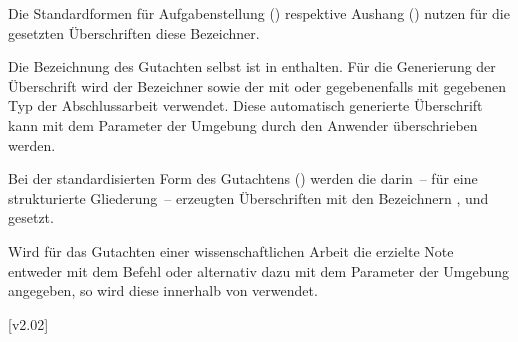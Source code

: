 \begin{DeclareEntity}{}
\begin{Declaration}
\begin{Declaration}
Die Standardformen für Aufgabenstellung () respektive Aushang 
() nutzen für die gesetzten Überschriften diese Bezeichner.
\end{Declaration}
\end{Declaration}

\begin{Declaration}
  {}
\begin{Declaration}
  {}
\printdeclarationlist

Die Bezeichnung des Gutachten selbst ist in  enthalten. 
Für die Generierung der Überschrift wird der Bezeichner  
sowie der mit  oder gegebenenfalls mit  gegebenen 
Typ der Abschlussarbeit verwendet. Diese automatisch generierte Überschrift 
kann mit dem Parameter  der Umgebung 
 durch den Anwender überschrieben werden.
\end{Declaration}
\end{Declaration}

\begin{Declaration}
  {}
\begin{Declaration}
  {}
\printdeclarationlist

Bei der standardisierten Form des Gutachtens () werden 
die darin~-- für eine strukturierte Gliederung~-- erzeugten Überschriften mit 
den Bezeichnern ,  und  
gesetzt.
\end{Declaration}
\end{Declaration}

\begin{Declaration}
  {}
\printdeclarationlist

Wird für das Gutachten einer wissenschaftlichen Arbeit die erzielte Note 
entweder mit dem Befehl  oder alternativ dazu 
mit dem Parameter  der Umgebung 
 angegeben, so wird diese innerhalb von 
 verwendet.
\end{Declaration}

\begin{Declaration}
  {}
\begin{Declaration}
  {}
  [v2.02]
\printdeclarationlist


\end{Declaration}
\end{Declaration}
\end{DeclareEntity}
